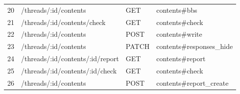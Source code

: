 \documentclass[a4j]{jarticle}
\begin{document}
\begin{table}[htb]
\begin{tabular}{|l|l|l||l|}
	20&	/threads/:id/contents      		 &    GET    & contents\#bbs        \\
	21&	/threads/:id/contents/check 	&     GET    &  contents\#check   \\
	22&	/threads/:id/contents          	 &    POST  & contents\#write     \\
	23&	/threads/:id/contents          	 &    PATCH  & contents\#responses\_hide     \\
	24&	/threads/:id/contents/:id/report	 &    GET    & contents\#report    \\
	25&	/threads/:id/contents/:id/check   &   GET    &  contents\#check      \\
	26&	/threads/:id/contents            	 &   POST   & contents\#report\_create \\ \hline

\end{tabular}

\end{table}
\end{document}
